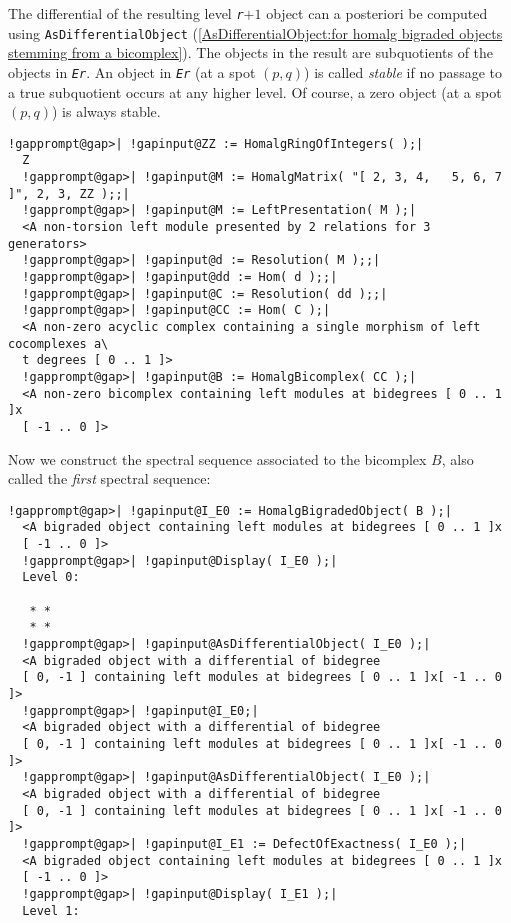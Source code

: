 \documentclass[a4paper,11pt]{report}
\begin{document}
{{{ The differential of the resulting level \mbox{\texttt{\mdseries\slshape r}}$+1$ object can a posteriori be computed using \texttt{AsDifferentialObject} (\ref{AsDifferentialObject:for homalg bigraded objects stemming from a bicomplex}). The objects in the result are subquotients of the objects in \mbox{\texttt{\mdseries\slshape Er}}. An object in \mbox{\texttt{\mdseries\slshape Er}} (at a spot $(p,q)$) is called \emph{stable} if no passage to a true subquotient occurs at any higher level. Of course, a
zero object (at a spot $(p,q)$) is always stable. 
\begin{Verbatim}[commandchars=!@|,fontsize=\small,frame=single,label=Example]
  !gapprompt@gap>| !gapinput@ZZ := HomalgRingOfIntegers( );|
  Z
  !gapprompt@gap>| !gapinput@M := HomalgMatrix( "[ 2, 3, 4,   5, 6, 7 ]", 2, 3, ZZ );;|
  !gapprompt@gap>| !gapinput@M := LeftPresentation( M );|
  <A non-torsion left module presented by 2 relations for 3 generators>
  !gapprompt@gap>| !gapinput@d := Resolution( M );;|
  !gapprompt@gap>| !gapinput@dd := Hom( d );;|
  !gapprompt@gap>| !gapinput@C := Resolution( dd );;|
  !gapprompt@gap>| !gapinput@CC := Hom( C );|
  <A non-zero acyclic complex containing a single morphism of left cocomplexes a\
  t degrees [ 0 .. 1 ]>
  !gapprompt@gap>| !gapinput@B := HomalgBicomplex( CC );|
  <A non-zero bicomplex containing left modules at bidegrees [ 0 .. 1 ]x
  [ -1 .. 0 ]>
\end{Verbatim}
 Now we construct the spectral sequence associated to the bicomplex $B$, also called the \emph{first} spectral sequence: 
\begin{Verbatim}[commandchars=!@|,fontsize=\small,frame=single,label=Example]
  !gapprompt@gap>| !gapinput@I_E0 := HomalgBigradedObject( B );|
  <A bigraded object containing left modules at bidegrees [ 0 .. 1 ]x
  [ -1 .. 0 ]>
  !gapprompt@gap>| !gapinput@Display( I_E0 );|
  Level 0:
  
   * *
   * *
  !gapprompt@gap>| !gapinput@AsDifferentialObject( I_E0 );|
  <A bigraded object with a differential of bidegree
  [ 0, -1 ] containing left modules at bidegrees [ 0 .. 1 ]x[ -1 .. 0 ]>
  !gapprompt@gap>| !gapinput@I_E0;|
  <A bigraded object with a differential of bidegree
  [ 0, -1 ] containing left modules at bidegrees [ 0 .. 1 ]x[ -1 .. 0 ]>
  !gapprompt@gap>| !gapinput@AsDifferentialObject( I_E0 );|
  <A bigraded object with a differential of bidegree
  [ 0, -1 ] containing left modules at bidegrees [ 0 .. 1 ]x[ -1 .. 0 ]>
  !gapprompt@gap>| !gapinput@I_E1 := DefectOfExactness( I_E0 );|
  <A bigraded object containing left modules at bidegrees [ 0 .. 1 ]x
  [ -1 .. 0 ]>
  !gapprompt@gap>| !gapinput@Display( I_E1 );|
  Level 1:
  

\end{Verbatim}}}}
\end{document}
